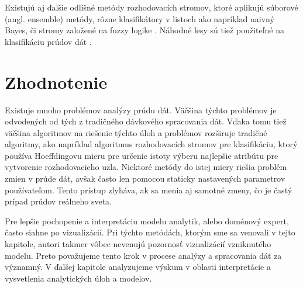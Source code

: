 \par
Existujú aj ďalšie odlišné metódy rozhodovacích stromov, ktoré aplikujú súborové (angl. ensemble) metódy, rôzne klasifikátory v listoch ako napríklad naivný Bayes, či stromy založené na fuzzy logike \citep{aggarwal2014survey}. Náhodné lesy sú tiež použiteľné na klasifikáciu prúdov dát \citep{abdulsalam2007streaming, abdulsalam2011classification}.

\section{Zhodnotenie}
Existuje mnoho problémov analýzy prúdu dát. Väčšina týchto problémov je odvodených od tých z tradičného dávkového spracovania dát. Vďaka tomu tiež väčšina algoritmov na riešenie týchto úloh a problémov rozširuje tradičné algoritmy, ako napríklad algoritmus rozhodovacích stromov pre klasifikáciu, ktorý používa Hoeffdingovu mieru pre určenie istoty výberu najlepšie atribútu pre vytvorenie rozhodovacieho uzla. Niektoré metódy do istej miery riešia problém zmien v prúde dát, avšak často len pomocou staticky nastavených parametrov používateľom. Tento prístup zlyháva, ak sa menia aj samotné zmeny, čo je častý prípad prúdov reálneho sveta.
\par
Pre lepšie pochopenie a interpretáciu modelu analytik, alebo doménový expert, často siahne po vizualizácií. Pri týchto metódách, ktorým sme sa venovali v tejto kapitole, autori takmer vôbec nevenujú pozornosť vizualizácií vzniknutého modelu. Preto považujeme tento krok v procese analýzy a spracovania dát za významný. V ďalšej kapitole analyzujeme výskum v oblasti interpretácie a vysvetlenia analytických úloh a modelov.


